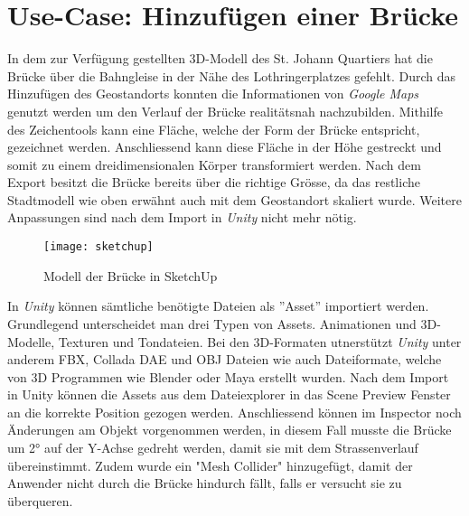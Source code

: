  
 
 
 
\newpage
\section{Use-Case: Hinzufügen einer Brücke}\label{s.brücke}
In dem zur Verfügung gestellten 3D-Modell des St. Johann Quartiers hat die Brücke über die Bahngleise in der Nähe des Lothringerplatzes gefehlt. Durch das Hinzufügen des Geostandorts konnten die Informationen von \textit{Google Maps} genutzt werden um den Verlauf der Brücke realitätsnah nachzubilden. Mithilfe des Zeichentools kann eine Fläche, welche der Form der Brücke entspricht, gezeichnet werden. Anschliessend kann diese Fläche in der Höhe gestreckt und somit zu einem dreidimensionalen Körper transformiert werden. Nach dem Export besitzt die Brücke bereits über die richtige Grösse, da das restliche Stadtmodell wie oben erwähnt auch mit dem Geostandort skaliert wurde. Weitere Anpassungen sind nach dem Import in \textit{Unity} nicht mehr nötig.\\[6pt]

\begin{figure}[ht]
	\vspace{-20pt}
	\begin{center}
		\texttt{[image: sketchup]}
	\end{center}
	\vspace{-15pt}
	\caption{Modell der Brücke in SketchUp}\label{sketchup}
	\vspace{-12pt}
\end{figure}

\newpage
In \textit{Unity} können sämtliche benötigte Dateien als ''Asset'' importiert werden. Grundlegend unterscheidet man drei Typen von Assets. Animationen und 3D-Modelle, Texturen und Tondateien. Bei den 3D-Formaten utnerstützt \textit{Unity} unter anderem FBX, Collada DAE und OBJ Dateien wie auch Dateiformate, welche von 3D Programmen wie Blender oder Maya erstellt wurden. Nach dem Import in Unity können die Assets aus dem Dateiexplorer in das Scene Preview Fenster an die korrekte Position gezogen werden. Anschliessend können im Inspector noch Änderungen am Objekt vorgenommen werden, in diesem Fall musste die Brücke um 2° auf der Y-Achse gedreht werden, damit sie mit dem Strassenverlauf übereinstimmt. Zudem wurde ein "Mesh Collider" hinzugefügt, damit der Anwender nicht durch die Brücke hindurch fällt, falls er versucht sie zu überqueren.\\[6pt]
 
